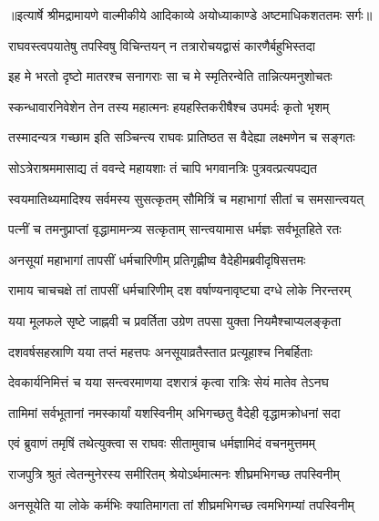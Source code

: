 {॥इत्यार्षे श्रीमद्रामायणे वाल्मीकीये आदिकाव्ये अयोध्याकाण्डे अष्टमाधिकशततमः सर्गः॥}


\twolineshloka
{राघवस्त्वपयातेषु तपस्विषु विचिन्तयन्}
{न तत्रारोचयद्वासं कारणैर्बहुभिस्तदा} %

\twolineshloka
{इह मे भरतो दृष्टो मातरश्च सनागराः}
{सा च मे स्मृतिरन्वेति तान्नित्यमनुशोचतः} %

\twolineshloka
{स्कन्धावारनिवेशेन तेन तस्य महात्मनः}
{हयहस्तिकरीषैश्च उपमर्दः कृतो भृशम्} %

\twolineshloka
{तस्मादन्यत्र गच्छाम इति सञ्चिन्त्य राघवः}
{प्रातिष्ठत स वैदेह्या लक्ष्मणेन च सङ्गतः} %

\twolineshloka
{सोऽत्रेराश्रममासाद्य तं ववन्दे महायशाः}
{तं चापि भगवानत्रिः पुत्रवत्प्रत्यपद्यत} %

\twolineshloka
{स्वयमातिथ्यमादिश्य सर्वमस्य सुसत्कृतम्}
{सौमित्रिं च महाभागां सीतां च समसान्त्वयत्} %

\twolineshloka
{पत्नीं च तमनुप्राप्तां वृद्धामामन्त्र्य सत्कृताम्}
{सान्त्वयामास धर्मज्ञः सर्वभूतहिते रतः} %

\twolineshloka
{अनसूयां महाभागां तापसीं धर्मचारिणीम्}
{प्रतिगृह्णीष्व वैदेहीमब्रवीदृषिसत्तमः} %

\twolineshloka
{रामाय चाचचक्षे तां तापसीं धर्मचारिणीम्}
{दश वर्षाण्यनावृष्ट्या दग्धे लोके निरन्तरम्} %

\twolineshloka
{यया मूलफले सृष्टे जाह्नवी च प्रवर्तिता}
{उग्रेण तपसा युक्ता नियमैश्चाप्यलङ्कृता} %

\twolineshloka
{दशवर्षसहस्राणि यया तप्तं महत्तपः}
{अनसूयाव्रतैस्तात प्रत्यूहाश्च निबर्हिताः} %

\twolineshloka
{देवकार्यनिमित्तं च यया सन्त्वरमाणया}
{दशरात्रं कृत्वा रात्रिः सेयं मातेव तेऽनघ} %

\twolineshloka
{तामिमां सर्वभूतानां नमस्कार्यां यशस्विनीम्}
{अभिगच्छतु वैदेही वृद्धामक्रोधनां सदा} %

\twolineshloka
{एवं ब्रुवाणं तमृषिं तथेत्युक्त्वा स राघवः}
{सीतामुवाच धर्मज्ञामिदं वचनमुत्तमम्} %

\twolineshloka
{राजपुत्रि श्रुतं त्वेतन्मुनेरस्य समीरितम्}
{श्रेयोऽर्थमात्मनः शीघ्रमभिगच्छ तपस्विनीम्} %

\twolineshloka
{अनसूयेति या लोके कर्मभिः क्यातिमागता}
{तां शीघ्रमभिगच्छ त्वमभिगम्यां तपस्विनीम्} %

